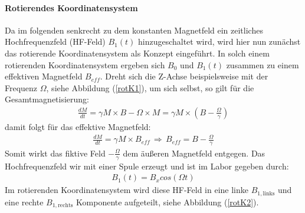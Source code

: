\paragraph{Rotierendes Koordinatensystem}
Da im folgenden senkrecht zu dem konstanten Magnet\-feld ein zeitliches Hochfrequenzfeld (HF-Feld) $B_1(t)$ hinzugeschaltet wird, wird hier nun zun\"{a}chst das rotierende Koordinatensystem als Konzept eingef\"{u}hrt.
In solch einem rotierenden Koordinatensystem ergeben sich $B_0$ und $B_1(t)$ zusammen zu einem effektiven Magnetfeld $B_{eff}$.
Dreht sich die Z-Achse beispielsweise mit der Frequenz $\Omega$, siehe Abbildung (\ref{rotK1}), um sich selbst, so gilt f\"{u}r die Gesamtmagnetisierung:
\begin{align*}
	\frac{dM}{dt} = \gamma M \times B - \Omega \times M = \gamma M \times \left(B - \frac{\Omega}{\gamma} \right)
\end{align*}
damit folgt f\"{u}r das effektive Magnetfeld:
\begin{align*}
	\frac{dM}{dt} = \gamma M \times B_{eff} \, \Rightarrow \, B_{eff} = B - \frac{\Omega}{\gamma}
\end{align*}
Somit wirkt das fiktive Feld $- \frac{\Omega}{\gamma}$ dem \"{a}u{\ss}eren Magnetfeld entgegen.
Das Hochfrequenzfeld wir mit einer Spule erzeugt und ist im Labor gegeben durch:
\begin{align*}
	B_1(t) = B_x cos(\Omega t)
\end{align*}
Im rotierenden Koordinatensystem wird diese HF-Feld in eine linke $B_{1,\text{links}}$ und eine rechte $B_{1,\text{rechts}}$ Komponente aufgeteilt, siehe Abbildung (\ref{rotK2}).
